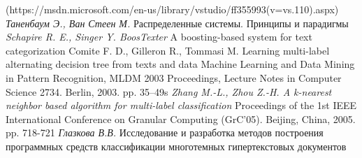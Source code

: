\documentclass[russian, utf8, emptystyle]{eskdtext}
\begin{document}
\begin{thebibliography}{50}
	{(https://msdn.microsoft.com/en-us/library/vstudio/ff355993(v=vs.110).aspx)}
	\textit{Таненбаум Э., Ван Стеен М.}
	{Распределенные системы. Принципы и парадигмы}
	\textit{Schapire R. E., Singer Y. BoosTexter}
	{A boosting-based system for text categorization}
	{Comite F. D., Gilleron R., Tommasi M. Learning multi-label alternating decision tree from texts and data}
	{Machine Learning and Data Mining in Pattern Recognition, MLDM 2003 Proceedings, Lecture Notes in Computer Science 2734. Berlin, 2003. pp. 35–49s}
	\textit{Zhang M.-L., Zhou Z.-H. A k-nearest neighbor based algorithm for multi-label classification }
	{Proceedings of the 1st IEEE International Conference on Granular Computing (GrC'05). Beijing, China, 2005. pp. 718-721}
	\textit{Глазкова В.В.}
	{Исследование и разработка методов построения программных средств классификации многотемных гипертекстовых документов}
\end{thebibliography}
\end{document}
